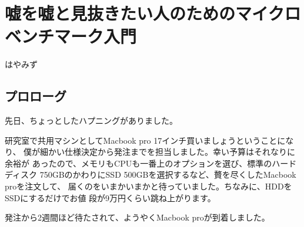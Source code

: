 
\chapter{嘘を嘘と見抜きたい人のためのマイクロベンチマーク入門}

\begin{flushright}
 はやみず
\end{flushright}

\section{プロローグ}

先日、ちょっとしたハプニングがありました。

研究室で共用マシンとしてMacbook pro 17インチ買いましょうということになり、
僕が細かい仕様決定から発注までを担当しました。幸い予算はそれなりに余裕が
あったので、メモリもCPUも一番上のオプションを選び、標準のハードディスク
750GBのかわりにSSD 500GBを選択するなど、贅を尽くしたMacbook proを注文して、
届くのをいまかいまかと待っていました。ちなみに、HDDをSSDにするだけでお値
段が9万円くらい跳ね上がります。

発注から2週間ほど待たされて、ようやくMacbook proが到着しました。